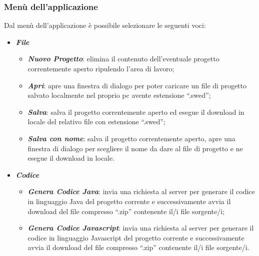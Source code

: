 \documentclass[../ManualeUtente.tex]{subfiles}
\begin{document}
			\subsubsection{Menù dell'applicazione}
				Dal menù dell'applicazione è possibile selezionare le seguenti voci:
				\begin{itemize}
					\item \textit{\textbf{File}}
					\begin{itemize}
						\item \textit{\textbf{Nuovo Progetto}}: elimina il contenuto dell'eventuale progetto
						correntemente aperto ripulendo l'area di lavoro;
						\item \textit{\textbf{Apri}}: apre una finestra di dialogo per poter caricare un
						file di progetto salvato localmente nel proprio pc avente estensione ``.swed'';
						\item \textit{\textbf{Salva}}: salva il progetto correntemente aperto ed esegue il
						download in locale del relativo file con estensione ``.swed'';
						\item \textit{\textbf{Salva con nome}}: salva il progetto correntemente aperto, apre
						una finestra di dialogo per scegliere il nome da dare al file di progetto e ne esegue
						il download in locale.
					\end{itemize}
					\newpage
					\item \textit{\textbf{Codice}}
					\begin{itemize}
						\item \textit{\textbf{Genera Codice Java}}: invia una richiesta al server per generare
						il codice in linguaggio Java del progetto corrente e successivamente avvia il
						download del file compresso ``.zip'' contenente il/i file sorgente/i;
						\item \textit{\textbf{Genera Codice Javascript}}: invia una richiesta al server per
						generare il codice in linguaggio Javascript del progetto corrente e successivamente
						avvia il download del file compresso ``.zip'' contenente il/i file sorgente/i.
					\end{itemize}
				\end{itemize}
\end{document}
